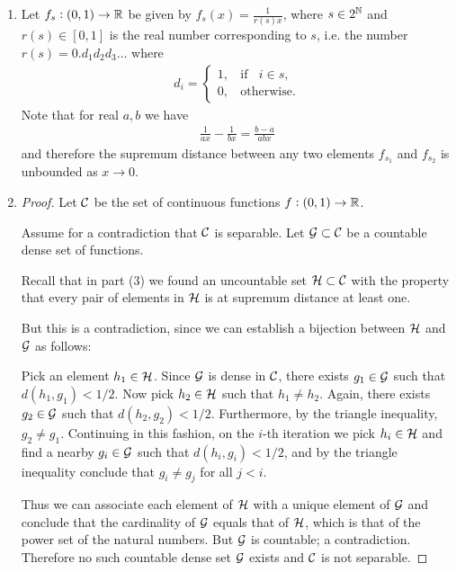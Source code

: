\begin{enumerate}[label=(2.\arabic*)]
\item Let $f_s: (0, 1) \to \mathbb{R}$ be given by $f_s(x) = \frac{1}{r(s)x}$, where $s \in 2^{\mathbb{N}}$ and $r(s) \in [0, 1]$ is
  the real number corresponding to $s$, i.e. the number $r(s) = 0.d_1d_2d_3\ldots$ where
  \begin{align*}
    d_i =
    \begin{cases}
      1, ~~~~ \text{if} ~~~~ i \in s,\\
      0, ~~~~ \text{otherwise}.
    \end{cases}
  \end{align*}
  Note that for real $a, b$ we have
  \begin{align*}
    \frac{1}{ax} - \frac{1}{bx} = \frac{b - a}{abx}
  \end{align*}
  and therefore the supremum distance between any two elements $f_{s_1}$ and $f_{s_2}$ is unbounded
  as $x \to 0$.

\item
  \begin{proof}
    Let $\mathcal C$ be the set of continuous functions $f: (0, 1) \to \mathbb{R}$.

    Assume for a contradiction that $\mathcal C$ is separable. Let $\mathcal G \subset \mathcal C$ be a countable dense set of
    functions.

    Recall that in part (3) we found an uncountable set $\mathcal H \subset \mathcal C$ with the property that every pair
    of elements in $\mathcal H$ is at supremum distance at least one.

    But this is a contradiction, since we can establish a bijection between $\mathcal H$ and $\mathcal G$ as follows:

    Pick an element $h_1 \in \mathcal H$. Since $\mathcal G$ is dense in $\mathcal C$, there exists $g_1 \in \mathcal G$ such
    that $d(h_1, g_1) < 1/2$. Now pick $h_2 \in \mathcal H$ such that $h_1 \neq h_2$. Again, there
    exists $g_2 \in \mathcal G$ such that $d(h_2, g_2) < 1/2$. Furthermore, by the triangle
    inequality, $g_2 \neq g_1$. Continuing in this fashion, on the $i$-th iteration we pick $h_i \in \mathcal H$ and
    find a nearby $g_i \in \mathcal G$ such that $d(h_i, g_i) < 1/2$, and by the triangle inequality conclude
    that $g_i \neq g_j$ for all $j < i$.

    Thus we can associate each element of $\mathcal H$ with a unique element of $\mathcal G$ and conclude that the
    cardinality of $\mathcal G$ equals that of $\mathcal H$, which is that of the power set of the natural numbers.
    But $\mathcal G$ is countable; a contradiction. Therefore no such countable dense set $\mathcal G$ exists and $\mathcal C$
    is not separable.
  \end{proof}
\end{enumerate}



